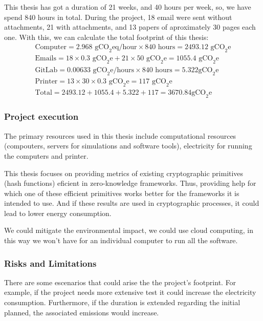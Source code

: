 This thesis has got a duration of 21 weeks, and 40 hours per week, so, we have spend 840 hours in total. During the project, 18 email were sent without attachments, 21 with attachments, and 13 papers of aproximately 30 pages each one. With this, we can calculate the total footprint of this thesis:
\begin{align*}
    \text{Computer}=2.968\text{ gCO}_2\text{eq/hour}\times840\text{ hours}=2493.12\text{ gCO}_2\text{e} \\
    \text{Emails}=18\times0.3\text{ gCO}_2\text{e}+21\times50\text{ gCO}_2\text{e}=1055.4\text{ gCO}_2\text{e} \\
    \text{GitLab}=0.00633\text{ gCO}_2\text{e/hours}\times840\text{ hours}=5.322\text{gCO}_2\text{e} \\
    \text{Printer}=13\times30\times0.3\text{ gCO}_2\text{e}=117\text{ gCO}_2\text{e}\\
    \text{Total}=2493.12+1055.4+5.322+117=3670.84\text{gCO}_2\text{e}
\end{align*}

\subsubsection*{Project execution}
The primary resources used in this thesis include computational resources (compouters, servers for simulations and software tools), electricity for running the computers and printer.

This thesis focuses on providing metrics of existing cryptographic primitives (hash functions) eficient in zero-knowledge frameworks. Thus, providing help for which one of these efficient primitives works better for the frameworks it is intended to use. And if these results are used in cryptographic processes, it could lead to lower energy consumption.

We could mitigate the environmental impact, we could use cloud computing, in this way we won't have for an individual computer to run all the software.

\subsubsection*{Risks and Limitations}
There are some escenarios that could arise the the project's footprint. For example, if the project needs more extensive test it could increase the electricity consumption. Furthermore, if the duration is extended regarding the initial planned, the associated emissions would increase.

